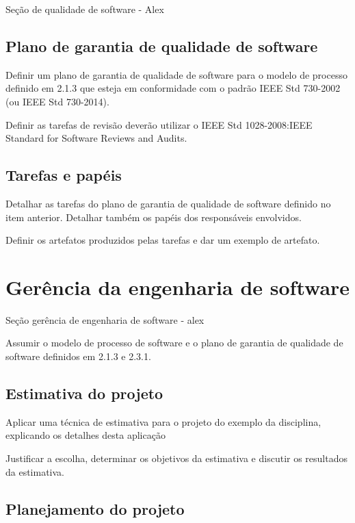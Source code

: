 \large{Seção de qualidade de software - Alex}

\subsection{Plano de garantia de qualidade de software}

Definir um plano de garantia de qualidade de software para
o modelo de processo definido em 2.1.3 que esteja em
conformidade com o padrão IEEE Std 730-2002 (ou IEEE
Std 730-2014).

Definir as tarefas de revisão deverão utilizar o IEEE Std
1028-2008:IEEE Standard for Software Reviews and Audits.

\subsection{Tarefas e papéis}

Detalhar as tarefas do plano de garantia de qualidade de
software definido no item anterior. Detalhar também os
papéis dos responsáveis envolvidos.

Definir os artefatos produzidos pelas tarefas e dar um
exemplo de artefato.



\section{Gerência da engenharia de software}
\label{sec:gerenciaengenharia}

\large{Seção gerência de engenharia de software - alex}

Assumir o modelo de processo de software e o plano de garantia
de qualidade de software definidos em 2.1.3 e 2.3.1.

\subsection{Estimativa do projeto}

Aplicar uma técnica de estimativa para o projeto do
exemplo da disciplina, explicando os detalhes desta
aplicação

Justificar a escolha, determinar os objetivos da estimativa e
discutir os resultados da estimativa.

\subsection{Planejamento do projeto}

